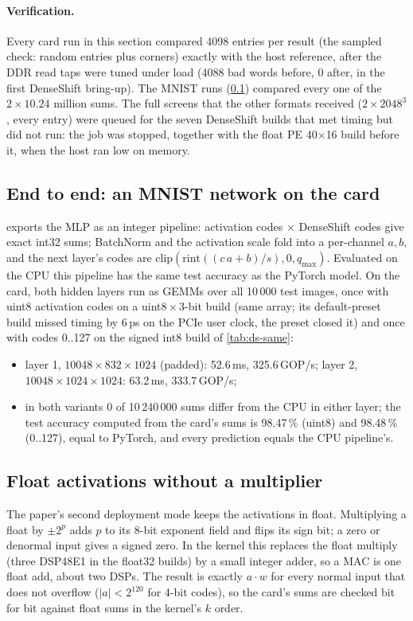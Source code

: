 \paragraph{Verification.} Every card run in this section compared 4098 entries per result (the sampled check: random
entries plus corners) exactly with the host reference, after the DDR read taps were tuned under load (4088 bad words
before, 0 after, in the first DenseShift bring-up). The MNIST runs (\cref{sec:ds:e2e}) compared every one of the
\(2\times10.24\) million sums. The full screens that the other formats received (\(2\times2048^3\), every entry) were
queued for the seven DenseShift builds that met timing but did not run: the job was stopped, together with the float
PE 40\(\times\)16 build before it, when the host ran low on memory.

\subsection{End to end: an MNIST network on the card}
\label{sec:ds:e2e}
 exports the MLP as an integer pipeline: activation codes \(\times\) DenseShift codes
give exact int32 sums; BatchNorm and the activation scale fold into a per-channel \(a, b\), and the next layer's codes
are \(\mathrm{clip}(\mathrm{rint}((c\,a + b)/s), 0, q_{\max})\). Evaluated on the CPU this pipeline has the same test
accuracy as the PyTorch model. On the card, both hidden layers run as GEMMs over all 10\,000 test images, once with
uint8 activation codes on a uint8\,\(\times\)\,3-bit build (same array; its default-preset build missed timing by
6\,ps on the PCIe user clock, the  preset closed it) and once with codes 0..127 on the signed int8 build
of \cref{tab:ds-same}:
\begin{itemize}
  \item layer 1, \(10048\times832\times1024\) (padded): 52.6\,ms, 325.6\,GOP/s; layer 2,
        \(10048\times1024\times1024\): 63.2\,ms, 333.7\,GOP/s;
  \item in both variants 0 of 10\,240\,000 sums differ from the CPU in either layer; the test accuracy computed from
        the card's sums is 98.47\,\% (uint8) and 98.48\,\% (0..127), equal to PyTorch, and every prediction equals
        the CPU pipeline's.
\end{itemize}

\subsection{Float activations without a multiplier}
\label{sec:ds:float}
The paper's second deployment mode keeps the activations in float. Multiplying a float by \(\pm2^p\) adds \(p\) to its
8-bit exponent field and flips its sign bit; a zero or denormal input gives a signed zero. In the kernel this replaces
the float multiply (three DSP48E1 in the float32 builds) by a small integer adder, so a MAC is one float add, about two
DSPs. The result is exactly \(a\cdot w\) for every normal input that does not overflow (\(|a| < 2^{120}\) for 4-bit
codes), so the card's sums are checked bit for bit against float sums in the kernel's \(k\) order.


